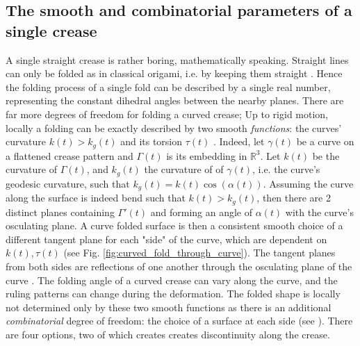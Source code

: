 \subsection{The smooth and combinatorial parameters of a single crease}
A single straight crease is rather boring, mathematically speaking. Straight lines can only be folded as in classical origami, i.e. by keeping them straight \cite{demaine_lens}. Hence the folding process of a single fold can be described by a single real number, representing the constant dihedral angles between the nearby planes. There are far more degrees of freedom for folding a curved crease; Up to rigid motion, locally a folding can be exactly described by two smooth \textit{functions}: the curves' curvature $k(t) > k_g(t)$ and its torsion $\tau(t)$  \cite{more_on_paper, duncan_folded}. Indeed, let $\gamma(t)$ be a curve on a flattened crease pattern and $\Gamma(t)$ is its embedding in $\mathbb{R}^3$. Let $k(t)$ be the curvature of $\Gamma(t)$, and $k_g(t)$ the curvature of of $\gamma(t)$, i.e. the curve's geodesic curvature, such that $k_g(t) = k(t) \cos(\alpha(t))$. Assuming the curve along the surface is indeed bend such that $k(t) > k_g(t)$, then there are 2 distinct planes containing $\Gamma'(t)$ and forming an angle of $\alpha(t)$ with the curve's osculating plane. A curve folded surface is then a consistent smooth choice of a different tangent plane for each "side" of the curve, which are dependent on $k(t),\tau(t)$ (see Fig. \ref{fig:curved_fold_through_curve}). The tangent planes from both sides are reflections of one another through the osculating plane of the curve \cite{curved_folding_kilian}.
The folding angle of a curved crease can vary along the curve, and the ruling patterns can change during the deformation. The folded shape is locally not determined only by these two smooth functions as there is an additional \textit{combinatorial} degree of freedom: the choice of a surface at each side (see ). There are four options, two of which creates creates discontinuity along the crease. %



